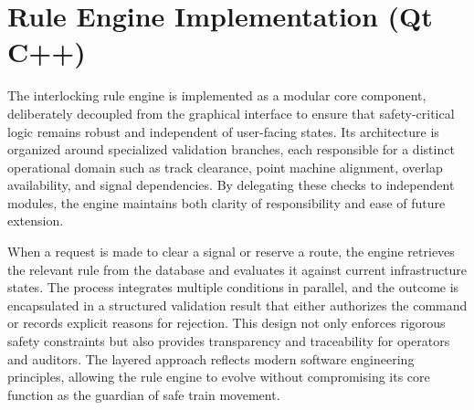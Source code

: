 \section{Rule Engine Implementation (Qt C++)}
\label{sec:implementation:rule-engine}

The interlocking rule engine is implemented as a modular core component, deliberately decoupled from the graphical interface to ensure that safety-critical logic remains robust and independent of user-facing states. Its architecture is organized around specialized validation branches, each responsible for a distinct operational domain such as track clearance, point machine alignment, overlap availability, and signal dependencies. By delegating these checks to independent modules, the engine maintains both clarity of responsibility and ease of future extension.

When a request is made to clear a signal or reserve a route, the engine retrieves the relevant rule from the database and evaluates it against current infrastructure states. The process integrates multiple conditions in parallel, and the outcome is encapsulated in a structured validation result that either authorizes the command or records explicit reasons for rejection. This design not only enforces rigorous safety constraints but also provides transparency and traceability for operators and auditors. The layered approach reflects modern software engineering principles, allowing the rule engine to evolve without compromising its core function as the guardian of safe train movement.